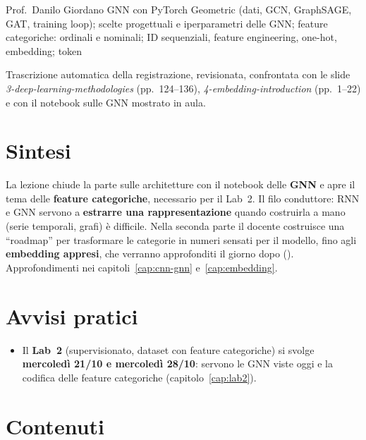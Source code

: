   {Prof.~Danilo Giordano}
  {GNN con PyTorch Geometric (dati, GCN, GraphSAGE, GAT, training loop); scelte progettuali e iperparametri
   delle GNN; feature categoriche: ordinali e nominali; ID sequenziali, feature engineering, one-hot, embedding;
   token }
\label{lez:2026-10-19}

\begin{nota}[Fonte]
Trascrizione automatica della registrazione, revisionata, confrontata con le slide
\emph{3-deep-learning-methodologies} (pp.~124--136), \emph{4-embedding-introduction} (pp.~1--22) e con il
notebook sulle GNN mostrato in aula.
\end{nota}

\section{Sintesi}
La lezione chiude la parte sulle architetture con il notebook delle \textbf{GNN} e apre il tema delle
\textbf{feature categoriche}, necessario per il Lab~2. Il filo conduttore: RNN e GNN servono a
\textbf{estrarre una rappresentazione} quando costruirla a mano (serie temporali, grafi) è difficile. Nella
seconda parte il docente costruisce una ``roadmap'' per trasformare le categorie in numeri sensati per il
modello, fino agli \textbf{embedding appresi}, che verranno approfonditi il giorno dopo
(). Approfondimenti nei capitoli~\ref{cap:cnn-gnn} e~\ref{cap:embedding}.

\section{Avvisi pratici}
\begin{itemize}
  \item Il \textbf{Lab~2} (supervisionato, dataset con feature categoriche) si svolge \textbf{mercoledì 21/10 e
    mercoledì 28/10}: servono le GNN viste oggi e la codifica delle feature categoriche
    (capitolo~\ref{cap:lab2}).
\end{itemize}

\section{Contenuti}

